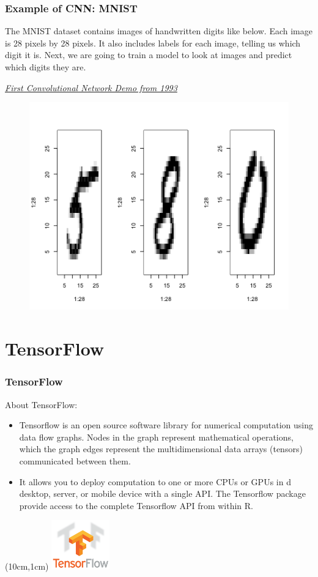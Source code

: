 \documentclass{beamer}
\begin{document}
\begin{frame}
	\frametitle{Example of CNN: MNIST}
	The MNIST dataset contains images of handwritten digits like below. Each image is 28 pixels by 28 pixels. It also includes labels for each image, telling us which digit it is. Next, we are going to train a model to look at images and predict which digits they are.
	
	\href{https://www.youtube.com/watch?v=FwFduRA_L6Q}{ \textit{\textcolor{pblue}{First Convolutional Network Demo from 1993}}}
	
	\begin{figure}
		\includegraphics[width=0.9\linewidth, height=0.4\linewidth]{MNIST1}
	\end{figure}
	
\end{frame}

\section{TensorFlow}
\begin{frame}
	\frametitle{TensorFlow}
	
\vspace{0.5in}
About TensorFlow:
\begin{itemize}
	\item Tensorflow is an open source software library for numerical computation using data flow graphs. Nodes in the graph represent mathematical operations, which the graph edges represent the multidimensional data arrays (tensors) communicated between them. 
	\item It allows you to deploy computation to one or more CPUs or GPUs in d desktop, server, or mobile device with a single API. The Tensorflow package provide access to the complete Tensorflow API from within R. 
\end{itemize}
	\begin{textblock*}{5cm}(10cm,1cm) %
		\includegraphics[width=2.5cm]{tensorflow_logo}
	\end{textblock*}
\end{frame}
\end{document}
